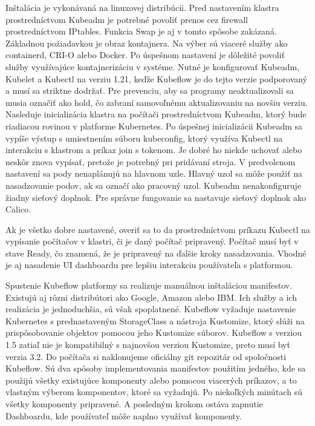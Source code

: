 Inštalácia je vykonávaná na linuxovej distribúcii. Pred nastavením klastra prostredníctvom Kubeadm je potrebné povoliť prenos cez firewall prostredníctvom IPtables. Funkcia Swap je aj v tomto spôsobe zakázaná. Základnou požiadavkou je obraz kontajnera. Na výber sú viaceré služby ako containerd, CRI-O alebo Docker. Po úspešnom nastavení je dôležité povoliť služby využívajúce kontajnerizáciu v systéme. Nutné je konfigurovať Kubeadm, Kubelet a Kubectl na verziu 1.21, keďže Kubeflow je do tejto verzie podporovaný a musí sa striktne dodržať. Pre prevenciu, aby sa programy neaktualizovali sa musia označiť ako hold, čo zabraní samovoľnému aktualizovaniu na novšiu verziu. Nasleduje inicializácia klastra na počítači prostredníctvom Kubeadm, ktorý bude riadiacou rovinou v platforme Kubernetes. Po úspešnej inicializácii Kubeadm sa vypíše výstup s umiestnením súboru kubeconfig, ktorý využíva Kubectl na interakciu s klastrom a príkaz join s tokenom. Je dobré ho niekde uchovať alebo neskôr znova vypísať, pretože je potrebný pri pridávaní stroja. V predvolenom nastavení sa pody nenaplánujú na hlavnom uzle. Hlavný uzol sa môže použiť na nasadzovanie podov, ak sa označí ako pracovný uzol. Kubeadm nenakonfiguruje žiadny sieťový doplnok. Pre správne fungovanie sa nastavuje sieťový doplnok ako Calico.

Ak je všetko dobre nastavené, overiť sa to da prostredníctvom príkazu Kubectl na vypísanie počítačov v klastri, či je daný počítač pripravený. Počítač musí byť v stave Ready, čo znamená, že je pripravený na ďalšie kroky nasadzovania. Vhodné je aj nasadenie UI dashboardu pre lepšiu interakciu používateľa s platformou.

Spustenie Kubeflow platformy sa realizuje manuálnou inštaláciou manifestov. Existujú aj rôzni distribútori ako Google, Amazon alebo IBM. Ich služby a ich realizácia je jednoduchšia, sú však spoplatnené. Kubeflow vyžaduje nastavenie Kubernetes s prednastaveným StorageClass a nástroja Kustomize, ktorý slúži na prispôsobovanie objektov pomocou jeho Kustomize súborov. Kubeflow s verziou 1.5 zatiaľ nie je kompatibilný s najnovšou verziou Kustomize, preto musí byť verzia 3.2. Do počítača si naklonujeme oficiálny git repozitár od spoločnosti Kubeflow. Sú dva spôsoby implementovania manifestov použitím jedného, kde sa použijú všetky existujúce komponenty alebo pomocou viacerých príkazov, a to vlastným výberom komponentov, ktoré sa vyžadujú. Po niekoľkých minútach sú všetky komponenty pripravené. A posledným krokom ostáva zapnutie Dashboardu, kde používateľ môže naplno využívať komponenty.

